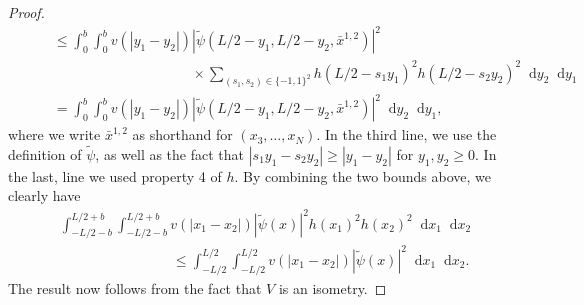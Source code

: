 \documentclass[a4paper,11pt]{article}
\newcommand{\abs}[1]{\left\lvert #1 \right\rvert}
\newcommand*\diff{\mathop{}\!\mathrm{d}}
\numberwithin{equation}{section}
\begin{document}
\begin{proof}
\begin{equation}
\begin{aligned}
		&\quad\quad\leq \int_{0}^{b}\int_{0}^{b}v(\abs{y_1-y_2})\abs{\tilde{\psi}(L/2-y_1,L/2- y_2,\bar{x}^{1,2})}^2\\&\hspace{5cm}\times\sum_{(s_1,s_2)\in\{-1,1\}^2}h(L/2-s_1 y_1)^2h(L/2-s_2 y_2)^2\diff y_2\diff y_1\\
		&\quad\quad=\int_{0}^{b}\int_{0}^{b}v(\abs{y_1-y_2})\abs{\tilde{\psi}(L/2-y_1,L/2- y_2,\bar{x}^{1,2})}^2\diff y_2\diff y_1,
		\end{aligned}
		\end{equation}
		where we write $\bar{x}^{1,2}$ as shorthand for $ (x_3,\dots, x_N)$.
		In the third line, we use the definition of $ \tilde{\psi} $, as well as the fact that $ \abs{s_1y_1-s_2y_2}\geq \abs{y_1-y_2} $ for $ y_1,y_2\geq 0 $. In the last, line we used property 4 of $ h $.
		By combining the two bounds above, we clearly have 
		\begin{equation}
		\begin{aligned}
		&\int_{-L/2-b}^{L/2+b}\int_{-L/2-b}^{L/2+b}v(\abs{x_1-x_2})\abs{\tilde{\psi}(x)}^2h(x_1)^2h(x_2)^2\diff x_1\diff x_2\\&\qquad\qquad\qquad\qquad \leq \int_{-L/2}^{L/2}\int_{-L/2}^{L/2}v(\abs{x_1-x_2})\abs{\tilde{\psi}(x)}^2\diff x_1\diff x_2.
		\end{aligned}
		\end{equation}
		 The result now follows from the fact that $ V $ is an isometry.
	\end{proof}
\end{document}
